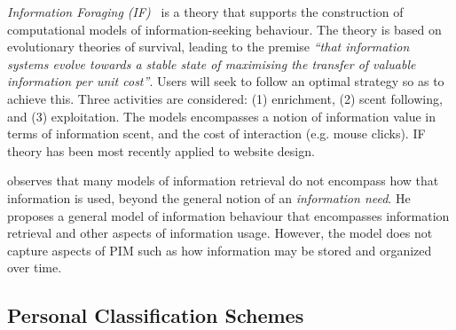 
\textit{Information Foraging (IF)}~\citep{pirolli:99} is a theory that supports the construction of computational models of information-seeking behaviour.  The theory is based on evolutionary theories of survival, leading to the premise \textit{``that information systems evolve towards a stable state of maximising the transfer of valuable information per unit cost''}.  Users will seek to follow an optimal strategy so as to achieve this.  Three activities are considered: (1) enrichment, (2) scent following, and (3) exploitation.
The models encompasses a notion of information value in terms of information scent, and the cost of interaction (e.g. mouse clicks). %
IF theory has been most recently applied to website design.





\citet{wilson:99} observes that many models of information retrieval do not encompass how that information is used, beyond the general notion of an \textit{information need}.  He proposes a general model of information behaviour that encompasses information retrieval and other aspects of information usage.  However, the model does not capture aspects of PIM such as how information may be stored and organized over time.








\subsection{Personal Classification Schemes}
\label{review:theory-classificationschemes}

